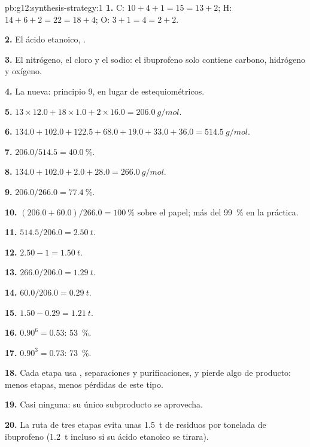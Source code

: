 \begin{solution}{pb:g12:synthesis-strategy:1}
\textbf{1.} C: $10 + 4 + 1 = 15 = 13 + 2$; H: $14 + 6 + 2 = 22 = 18 + 4$;
O: $3 + 1 = 4 = 2 + 2$.

\textbf{2.} El ácido etanoico, .

\textbf{3.} El nitrógeno, el cloro y el sodio: el ibuprofeno solo
contiene carbono, hidrógeno y oxígeno.

\textbf{4.} La nueva: principio 9,  en lugar de 
estequiométricos.

\textbf{5.} $13 \times 12.0 + 18 \times 1.0 + 2 \times 16.0 =
\qty{206.0}{g/mol}$.

\textbf{6.} $134.0 + 102.0 + 122.5 + 68.0 + 19.0 + 33.0 + 36.0 =
\qty{514.5}{g/mol}$.

\textbf{7.} $206.0/514.5 = \qty{40.0}{\percent}$.

\textbf{8.} $134.0 + 102.0 + 2.0 + 28.0 = \qty{266.0}{g/mol}$.

\textbf{9.} $206.0/266.0 = \qty{77.4}{\percent}$.

\textbf{10.} $(206.0 + 60.0)/266.0 = \qty{100}{\percent}$ sobre el
papel; más del \qty{99}{\percent} en la práctica.

\textbf{11.} $514.5/206.0 = \qty{2.50}{t}$.

\textbf{12.} $2.50 - 1 = \qty{1.50}{t}$.

\textbf{13.} $266.0/206.0 = \qty{1.29}{t}$.

\textbf{14.} $60.0/206.0 = \qty{0.29}{t}$.

\textbf{15.} $1.50 - 0.29 = \qty{1.21}{t}$.

\textbf{16.} $0.90^6 = 0.53$: \qty{53}{\percent}.

\textbf{17.} $0.90^3 = 0.73$: \qty{73}{\percent}.

\textbf{18.} Cada etapa usa , separaciones y purificaciones, y
pierde algo de producto: menos etapas, menos pérdidas de este tipo.

\textbf{19.} Casi ninguna: su único subproducto se aprovecha.

\textbf{20.} La ruta de tres etapas evita unas \qty{1.5}{t} de residuos
por tonelada de ibuprofeno (\qty{1.2}{t} incluso si su ácido etanoico se
tirara).
\end{solution}
